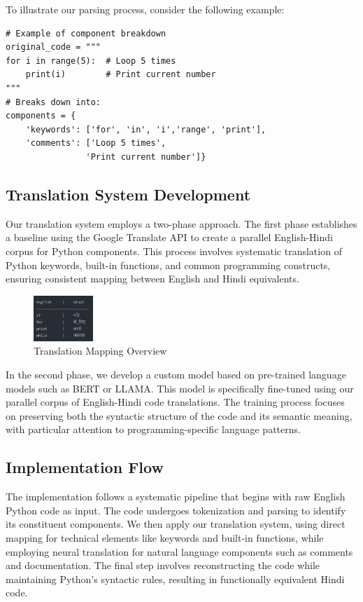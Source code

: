 \documentclass[9pt]{papertex}
\begin{document}
To illustrate our parsing process, consider the following example:

\begin{lstlisting}
# Example of component breakdown
original_code = """
for i in range(5):  # Loop 5 times
    print(i)        # Print current number
"""
# Breaks down into:
components = {
    'keywords': ['for', 'in', 'i','range', 'print'],
    'comments': ['Loop 5 times', 
                'Print current number']}
\end{lstlisting}

\subsection{Translation System Development}
Our translation system employs a two-phase approach. The first phase establishes a baseline using the Google Translate API to create a parallel English-Hindi corpus for Python components. This process involves systematic translation of Python keywords, built-in functions, and common programming constructs, ensuring consistent mapping between English and Hindi equivalents.
\begin{figure}[h]
    \centering
    \includegraphics[width=0.2\textwidth]{english-hindi-translation-mapping.png}
    \caption{Translation Mapping Overview}
    \label{fig:translation_system}
\end{figure}
In the second phase, we develop a custom model based on pre-trained language models such as BERT or LLAMA. This model is specifically fine-tuned using our parallel corpus of English-Hindi code translations. The training process focuses on preserving both the syntactic structure of the code and its semantic meaning, with particular attention to programming-specific language patterns.

\subsection{Implementation Flow}
The implementation follows a systematic pipeline that begins with raw English Python code as input. The code undergoes tokenization and parsing to identify its constituent components. We then apply our translation system, using direct mapping for technical elements like keywords and built-in functions, while employing neural translation for natural language components such as comments and documentation. The final step involves reconstructing the code while maintaining Python's syntactic rules, resulting in functionally equivalent Hindi code.
\end{document}

